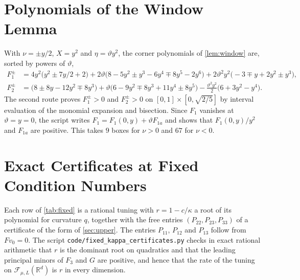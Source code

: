 \documentclass[11pt, a4paper]{article}
\newcommand{\file}{\nolinkurl}  %
\theoremstyle{definition}
\newcommand{\R}{\mathbb{R}}
\newcommand{\F}{\mathcal{F}_{\mu,L}}
\begin{document}
\section{Polynomials of the Window Lemma}
\label{app:polys}

With $\nu=\pm y/2$, $X=y^2$ and $\eta=\vartheta y^2$, the corner polynomials of \cref{lem:window} are, sorted by powers of
$\vartheta$,
\begin{align*}
  F_1^{\pm}&=4y^2\bigl(y^2\pm7y/2+2\bigr)+2\vartheta\bigl(8-5y^2\pm y^3-6y^4\mp8y^5-2y^6\bigr)
             +2\vartheta^2y^2\bigl(-3\mp y+2y^2\pm y^3\bigr),\\
  F_2^{\pm}&=\bigl(8\pm8y-12y^2\mp8y^3\bigr)+\vartheta\bigl(6-9y^2\mp8y^3+11y^4\pm8y^5\bigr)
             -\frac{\vartheta^2y^2}2\bigl(6+3y^2-y^4\bigr).
\end{align*}
The second route proves $F_1^\pm>0$ and $F_2^\pm>0$ on $[0,1]\times[0,\sqrt{2/5}]$ by interval evaluation of the
monomial expansion and bisection. Since $F_1$ vanishes at $\vartheta=y=0$, the script writes
${F_1=F_1(0,y)+\vartheta F_{1a}}$ and shows that $F_1(0,y)/y^2$ and $F_{1a}$ are positive. This takes $9$ boxes
for $\nu>0$ and $67$ for $\nu<0$.

\section{Exact Certificates at Fixed Condition Numbers}
\label{app:fixed}

Each row of \cref{tab:fixed} is a rational tuning with $r=1-c/\kappa$ a root of its polynomial for curvature $q$,
together with the free entries $(P_{22},P_{23},P_{33})$ of a certificate of the form of \cref{sec:upper}. The entries
$P_{11}$, $P_{12}$ and $P_{13}$ follow from $Fv_0=0$. The script \file{code/fixed_kappa_certificates.py} checks in exact
rational arithmetic that $r$ is the dominant root on quadratics and that the leading principal minors of $F_3$ and $G$
are positive, and hence that the rate of the tuning on $\F(\R^d)$ is $r$ in every dimension.
\end{document}

